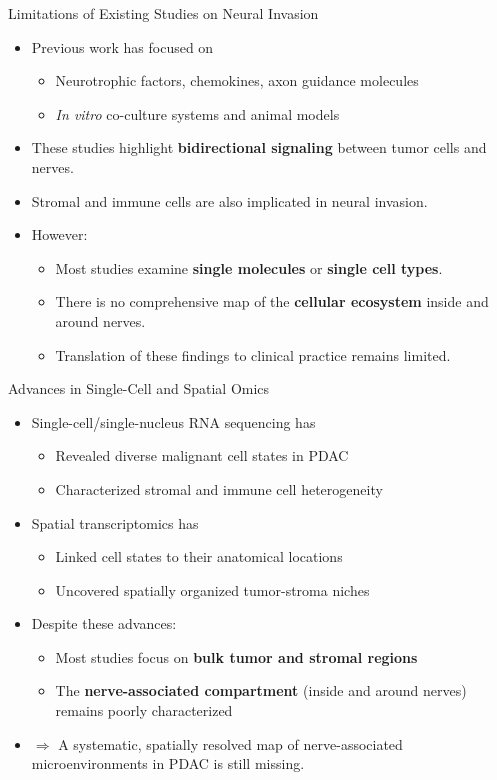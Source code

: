 \documentclass[10pt]{beamer}
\theoremstyle{plain}
\begin{document}
\begin{frame}{Limitations of Existing Studies on Neural Invasion}
  \begin{itemize}
    \item Previous work has focused on
      \begin{itemize}
        \item Neurotrophic factors, chemokines, axon guidance molecules
        \item \textit{In vitro} co-culture systems and animal models
      \end{itemize}
    \item These studies highlight \textbf{bidirectional signaling} between tumor cells and nerves.
    \item Stromal and immune cells are also implicated in neural invasion.
    \item However:
      \begin{itemize}
        \item Most studies examine \textbf{single molecules} or \textbf{single cell types}.
        \item There is no comprehensive map of the \textbf{cellular ecosystem} inside and around nerves.
        \item Translation of these findings to clinical practice remains limited.
      \end{itemize}
  \end{itemize}
\end{frame}

\begin{frame}{Advances in Single-Cell and Spatial Omics}
  \begin{itemize}
    \item Single-cell/single-nucleus RNA sequencing has
      \begin{itemize}
        \item Revealed diverse malignant cell states in PDAC
        \item Characterized stromal and immune cell heterogeneity
      \end{itemize}
    \item Spatial transcriptomics has
      \begin{itemize}
        \item Linked cell states to their anatomical locations
        \item Uncovered spatially organized tumor-stroma niches
      \end{itemize}
    \item Despite these advances:
      \begin{itemize}
        \item Most studies focus on \textbf{bulk tumor and stromal regions}
        \item The \textbf{nerve-associated compartment} (inside and around nerves) remains poorly characterized
      \end{itemize}
    \item \(\Rightarrow\) A systematic, spatially resolved map of nerve-associated microenvironments in PDAC is still missing.
  \end{itemize}
\end{frame}
\end{document}

